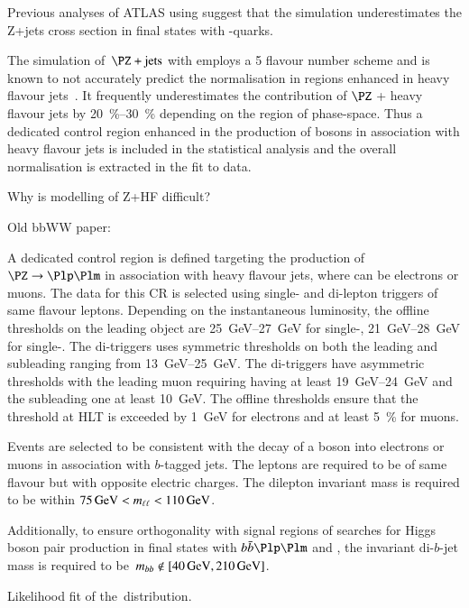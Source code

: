 
Previous analyses of ATLAS using  suggest that the
simulation underestimates the Z+jets cross section in final states
with \Pbottom-quarks.

The simulation of~$\PZ+\text{jets}$ with  employs a 5
flavour number scheme and is known to not accurately predict the
normalisation in regions enhanced in heavy flavour
jets~\cite{HIGG-2016-29,STDM-2017-38}. It frequently underestimates the
contribution of $\PZ$ + heavy flavour jets by
\SIrange{20}{30}{\percent} depending on the region of
phase-space. Thus a dedicated control region enhanced in the
production of \PZ bosons in association with heavy flavour jets is
included in the statistical analysis and the overall normalisation is
extracted in the fit to data.

Why is modelling of Z+HF difficult?

Old bbWW paper: \cite{HDBS-2018-33}

A dedicated control region is defined targeting the production of
$\PZ \ra \Plp\Plm$ in association with heavy flavour jets, where \Pl
can be electrons or muons. The data for this CR is selected using
single- and di-lepton triggers of same flavour leptons. Depending on
the instantaneous luminosity, the offline thresholds on the leading
object \pT are \SIrange{25}{27}{\GeV} for single-\Pe,
\SIrange{21}{28}{\GeV} for single-\Pmu. The di-\Pe triggers uses
symmetric \pT thresholds on both the leading and subleading ranging
from \SIrange{13}{25}{\GeV}. The di-\Pmu triggers have asymmetric
thresholds with the leading muon requiring having at least
\SIrange{19}{24}{\GeV} \pT and the subleading one at least
\SI{10}{\GeV}. The offline \pT thresholds ensure that the threshold at
HLT is exceeded by \SI{1}{\GeV} for electrons and at least
\SI{5}{\percent} for muons.

Events are selected to be consistent with the decay of a \PZ boson
into electrons or muons in association with $b$-tagged jets. The
leptons are required to be of same flavour but with opposite electric
charges. The dilepton invariant mass is required to be within
$\SI{75}{\ensuremath{\text{GeV}}} < m_{\ell\ell} < \SI{110}{\ensuremath{\text{GeV}}}$.

Additionally, to ensure orthogonality with signal regions of searches
for Higgs boson pair production in final states with $\bbbar\Plp\Plm$
and \MET, the invariant di-$b$-jet mass is required to
be~$\mBB \not\in [\SI{40}{\GeV}, \SI{210}{\GeV}]$.








Likelihood fit of the~\mll distribution.

